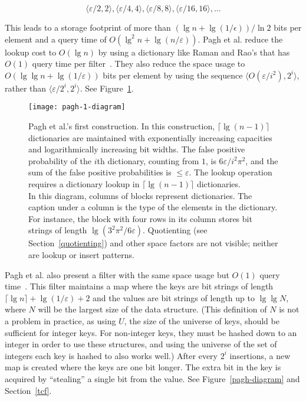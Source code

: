 \documentclass[letterpaper,twocolumn,10pt]{article}
\newcommand{\etal}{et al.}
\begin{document}
\[
\langle \varepsilon / 2, 2 \rangle,
 \langle \varepsilon / 4, 4 \rangle,
 \langle \varepsilon / 8, 8 \rangle,
 \langle \varepsilon / 16, 16 \rangle,
 \ldots
\]

This leads to a storage footprint of more than $(\lg n + \lg (1/\epsilon)) / \ln 2$ bits per element and a query time of $O(\lg^2 n + \lg (n/\varepsilon))$.
Pagh \etal{} reduce the lookup cost to $O(\lg n)$ by using a dictionary like Raman and Rao's that has $O(1)$ query time per filter~\cite{psw,succinct}.
They also reduce the space usage to $O(\lg \lg n + \lg (1/\varepsilon))$ bits per element by using the sequence $\langle O(\varepsilon / i^2),  2^i \rangle$, rather than  $\langle \varepsilon / 2^i,  2^i \rangle$.
See Figure~\ref{pagh-1-diagram}.

\begin{figure}
\texttt{[image: pagh-1-diagram]}
\caption{\label{pagh-1-diagram}
Pagh \etal{}'s first construction.
In this construction, $\lceil\lg (n-1) \rceil$ dictionaries are maintained with exponentially increasing capacities and logarithmically increasing bit widths.
The false positive probability of the $i$th dictionary, counting from $1$, is $6 \varepsilon / i^2 \pi^2$, and the sum of the false positive probabilities is $\le \varepsilon$.
The lookup operation requires a dictionary lookup in $\lceil\lg(n-1)\rceil$ dictionaries.\\
In this diagram, columns of blocks represent dictionaries.
The caption under a column is the type of the elements in the dictionary. For instance, the block with four rows in its column stores bit strings of length $\lg (3^2 \pi^2 / 6 \varepsilon)$.
Quotienting (see Section~\ref{quotienting}) and other space factors are not visible; neither are lookup or insert patterns.
}
\end{figure}

Pagh \etal{} also present a filter with the same space usage but $O(1)$ query time~\cite{psw}.
This filter maintains a map where the keys are bit strings of length $\lceil \lg n \rceil + \lg (1/\varepsilon) + 2$ and the values are bit strings of length up to $\lg \lg N$, where $N$ will be the largest size of the data structure.
(This definition of $N$ is not a problem in practice, as using $U$, the size of the universe of keys, should be sufficient for integer keys. For non-integer keys, they must be hashed down to an integer in order to use these structures, and using the universe of the set of integers each key is hashed to also works well.)
After every $2^i$ insertions, a new map is created where the keys are one bit longer.
The extra bit in the key is acquired by ``stealing'' a single bit from the value.
See Figure~\ref{pagh-diagram} and Section~\ref{tcf}.
\end{document}
